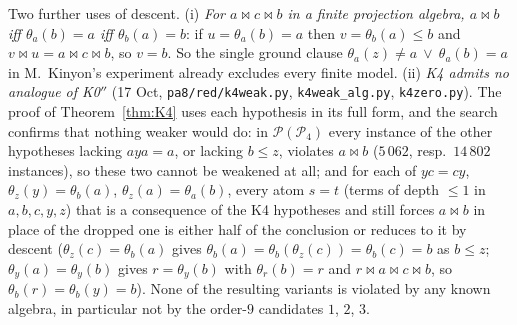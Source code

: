 \documentclass[11pt]{amsart}
\theoremstyle{definition}
\renewcommand{\P}{\mathcal{P}}
\newcommand{\mt}{\bowtie}   %
\begin{document}
Two further uses of descent. (i) \emph{For $a\mt c\mt b$ in a finite projection algebra, $a\mt b$ iff $\theta_a(b)=a$ iff $\theta_b(a)=b$}: if $u=\theta_a(b)=a$ then $v=\theta_b(a)\le b$ and $v\mt u=a\mt c\mt b$, so $v=b$. So the single ground clause $\theta_a(z)\ne a\ \vee\ \theta_a(b)=a$ in M.~Kinyon's experiment already excludes every finite model. (ii) \emph{K4 admits no analogue of K0$''$} (17 Oct, \texttt{pa8/red/k4weak.py}, \texttt{k4weak\_alg.py}, \texttt{k4zero.py}). The proof of Theorem~\ref{thm:K4} uses each hypothesis in its full form, and the search confirms that nothing weaker would do: in $\P(\P_4)$ every instance of the other hypotheses lacking $aya=a$, or lacking $b\le z$, violates $a\mt b$ ($5\,062$, resp.\ $14\,802$ instances), so these two cannot be weakened at all; and for each of $yc=cy$, $\theta_z(y)=\theta_b(a)$, $\theta_z(a)=\theta_a(b)$, every atom $s=t$ (terms of depth $\le1$ in $a,b,c,y,z$) that is a consequence of the K4 hypotheses and still forces $a\mt b$ in place of the dropped one is either half of the conclusion or reduces to it by descent ($\theta_z(c)=\theta_b(a)$ gives $\theta_b(a)=\theta_b(\theta_z(c))=\theta_b(c)=b$ as $b\le z$; $\theta_y(a)=\theta_y(b)$ gives $r=\theta_y(b)$ with $\theta_r(b)=r$ and $r\mt a\mt c\mt b$, so $\theta_b(r)=\theta_b(y)=b$). None of the resulting variants is violated by any known algebra, in particular not by the order-$9$ candidates $1$, $2$, $3$.
\end{document}
